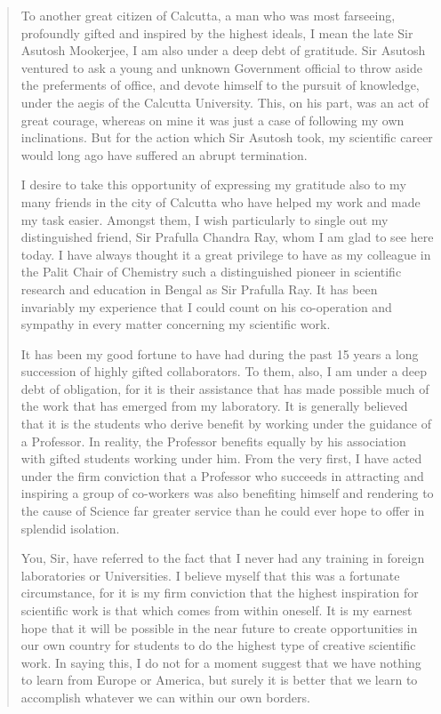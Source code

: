 \begin{quote}
{To another great citizen of Calcutta, a man who was most
farseeing, profoundly gifted and inspired by the highest ideals,
I mean the late Sir Asutosh Mookerjee, I am also under a deep
debt of gratitude. Sir Asutosh ventured to ask a young and
unknown Government official to throw aside the preferments of
office, and devote himself to the pursuit of knowledge, under the
aegis of the Calcutta University. This, on his part, was an act of
great courage, whereas on mine it was just a case of following
my own inclinations. But for the action which Sir Asutosh took,
my scientific career would long ago have suffered an abrupt
termination.

\newpage

I desire to take this opportunity of expressing my gratitude
also to my many friends in the city of Calcutta who have helped
my work and made my task easier. Amongst them, I wish
particularly to single out my distinguished friend, Sir Prafulla
Chandra Ray, whom I am glad to see here today. I have always
thought it a great privilege to have as my colleague in the Palit
Chair of Chemistry such a distinguished pioneer in scientific
research and education in Bengal as Sir Prafulla Ray. It has been
invariably my experience that I could count on his co-operation
and sympathy in every matter concerning my scientific work.


It has been my good fortune to have had during the past 15
years a long succession of highly gifted collaborators. To them,
also, I am under a deep debt of obligation, for it is their assistance 
that has made possible much of the work that has emerged from
my laboratory. It is generally believed that it is the students who
derive benefit by working under the guidance of a Professor. In
reality, the Professor benefits equally by his association with gifted
students working under him. From the very first, I have acted
under the firm conviction that a Professor who succeeds in
attracting and inspiring a group of co-workers was also benefiting
himself and rendering to the cause of Science far greater service
than he could ever hope to offer in splendid isolation.


You, Sir, have referred to the fact that I never had any
training in foreign laboratories or Universities. I believe myself
that this was a fortunate circumstance, for it is my firm conviction
that the highest inspiration for scientific work is that which comes
from within oneself. It is my earnest hope that it will be possible
in the near future to create opportunities in our own country for
students to do the highest type of creative scientific work. In saying
this, I do not for a moment suggest that we have nothing to learn
from Europe or America, but surely it is better that we learn to
accomplish whatever we can within our own borders.


}
\end{quote}
